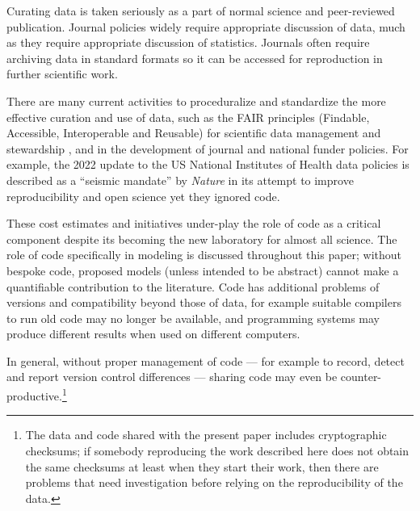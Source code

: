 \documentclass{comjnl}
\begin{document}
Curating data is taken seriously as a part of normal science and peer-reviewed publication. Journal policies widely require appropriate discussion of data, much as they require appropriate discussion of statistics. Journals often require archiving data in standard formats so it can be accessed for reproduction in further scientific work. 

There are many current activities to proceduralize and standardize the more effective curation and use of data, such as the FAIR principles (Findable, Accessible, Interoperable and Reusable) for scientific data management and stewardship \cite{fair,fair-principles}, and in the development of journal and national funder policies. For example, the 2022 update to the US National Institutes of Health data policies \cite{nih-policy} is described as a ``seismic mandate'' by \emph{Nature\/} \cite{nih-nature} in its attempt to improve reproducibility and open science yet they ignored code.

These cost estimates and initiatives under-play the role of code as a critical component despite its becoming the new laboratory for almost all science. The role of code specifically in modeling is discussed throughout this paper; without bespoke code, proposed models (unless intended to be abstract) cannot make a quantifiable contribution to the literature. Code has additional problems of versions and compatibility beyond those of data, for example suitable compilers to run old code may no longer be available, and  programming systems may produce different results when used on different computers. 

In general, without proper management of code --- for example to record, detect and report version control differences --- sharing code may even be counter-productive.\footnote{The data and code shared with the present paper includes cryptographic checksums; if somebody reproducing the work described here does not obtain the same checksums at least when they start their work, then there are problems that need investigation before relying on the reproducibility of the data.}
\end{document}
